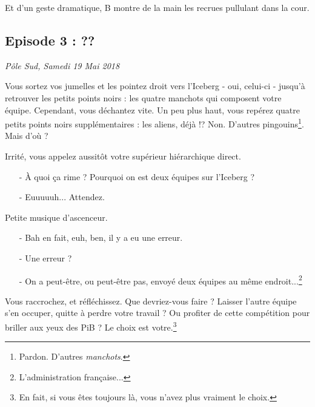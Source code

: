 Et d'un geste dramatique, B montre de la main les recrues pullulant dans la
cour.

\subsection{Episode 3 : ??}
\hfill \textit{Pôle Sud, Samedi 19 Mai 2018}

Vous sortez vos jumelles et les pointez droit vers l'Iceberg - oui, celui-ci -
jusqu'à retrouver les petits points noirs : les quatre manchots qui composent
votre équipe.
Cependant, vous déchantez vite. Un peu plus haut, vous repérez quatre petits
points noirs supplémentaires : les aliens, déjà !? Non. D'autres
pingouins\footnote{Pardon. D'autres \emph{manchots}.}. Mais d'où ?

Irrité, vous appelez aussitôt votre supérieur hiérarchique direct.

\begin{itemize}
    \item[-] À quoi ça rime ? Pourquoi on est deux équipes sur l'Iceberg ?
    \item[-] Euuuuuh... Attendez.
\end{itemize}

Petite musique d'ascenceur.

\begin{itemize}
    \item[-] Bah en fait, euh, ben, il y a eu une erreur.
    \item[-] Une erreur ?
    \item[-] On a peut-être, ou peut-être pas, envoyé deux équipes au même
        endroit...\footnote{L'administration française...}
\end{itemize}

Vous raccrochez, et réfléchissez. Que devriez-vous faire ? Laisser l'autre
équipe s'en occuper, quitte à perdre votre travail ? Ou profiter de cette
compétition pour briller aux yeux des PiB ? Le choix est votre.\footnote{En
fait, si vous êtes toujours là, vous n'avez plus vraiment le choix.}

